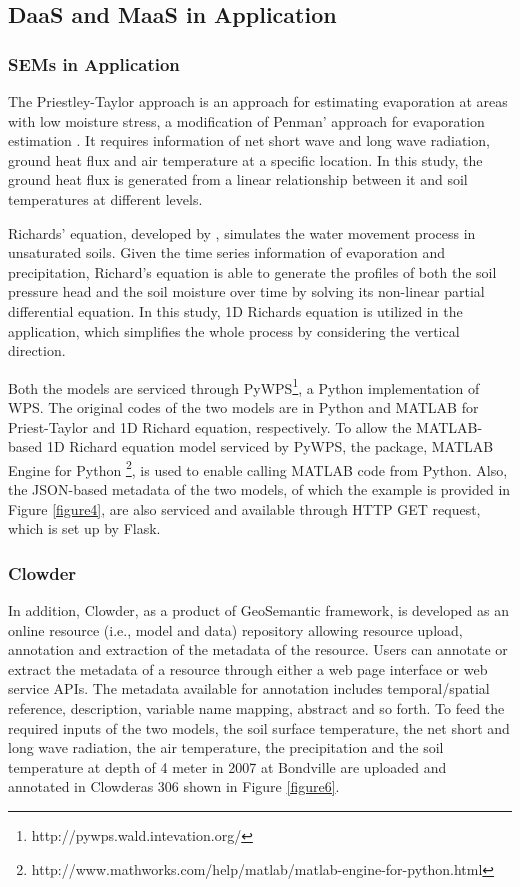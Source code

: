 \documentclass[review]{elsarticle}
\begin{document}
\subsection{DaaS and MaaS in Application} 
\subsubsection{SEMs in Application} The Priestley-Taylor approach is an approach for estimating evaporation at areas with low moisture stress, a modification of Penman’ approach for evaporation estimation \citep{priestley1972}. It requires information of net short wave and long wave radiation, ground heat flux and air temperature at a specific location. In this study, the ground heat flux is generated from a linear relationship between it and soil temperatures at different levels. 

Richards’ equation, developed by \cite{richards1931}, simulates the water movement process in unsaturated soils. Given the time series information of evaporation and precipitation, Richard’s equation is able to generate the profiles of both the soil pressure head and the soil moisture over time by solving its non-linear partial differential equation. In this study, 1D Richards equation is utilized in the application, which simplifies the whole process by considering the vertical direction. 

Both the models are serviced through PyWPS\footnote{http://pywps.wald.intevation.org/}, a Python implementation of WPS. The original codes of the two models are in Python and MATLAB for Priest-Taylor and 1D Richard equation, respectively. To allow the MATLAB-based 1D Richard equation model serviced by PyWPS, the package, MATLAB Engine for Python \footnote{http://www.mathworks.com/help/matlab/matlab-engine-for-python.html}, is used to enable calling MATLAB code from Python. Also, the JSON-based metadata of the two models, of which the example is provided in Figure \ref{figure4}, are also serviced and available through HTTP GET request, which is set up by Flask. 

\subsubsection{Clowder} In addition, Clowder, as a product of GeoSemantic framework, is developed as an online resource (i.e., model and data) repository allowing resource upload, annotation and extraction of the metadata of the resource. Users can annotate or extract the metadata of a resource through either a web page interface or web service APIs. The metadata available for annotation includes temporal/spatial reference, description, variable name mapping, abstract and so forth. To feed the required inputs of the two models, the soil surface temperature, the net short and long wave radiation, the air temperature, the precipitation and the soil temperature at depth of 4 meter in 2007 at Bondville are uploaded and annotated in Clowderas 306 shown in Figure \ref{figure6}.
\end{document}
